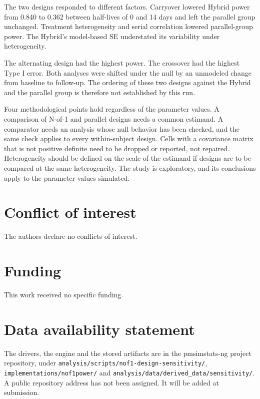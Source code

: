 \documentclass[
  11pt,
]{article}
\begin{document}
The two designs responded to different factors. Carryover lowered Hybrid power from 0.840 to 0.362 between half-lives of 0 and 14 days and left the parallel group unchanged. Treatment heterogeneity and serial correlation lowered parallel-group power. The Hybrid's model-based SE understated its variability under heterogeneity.

The alternating design had the highest power. The crossover had the highest Type I error. Both analyses were shifted under the null by an unmodeled change from baseline to follow-up. The ordering of these two designs against the Hybrid and the parallel group is therefore not established by this run.

Four methodological points hold regardless of the parameter values. A comparison of N-of-1 and parallel designs needs a common estimand. A comparator needs an analysis whose null behavior has been checked, and the same check applies to every within-subject design. Cells with a covariance matrix that is not positive definite need to be dropped or reported, not repaired. Heterogeneity should be defined on the scale of the estimand if designs are to be compared at the same heterogeneity. The study is exploratory, and its conclusions apply to the parameter values simulated.

\section{Conflict of interest}\label{conflict-of-interest}

The authors declare no conflicts of interest.

\section{Funding}\label{funding}

This work received no specific funding.

\section{Data availability statement}\label{data-availability-statement}

The drivers, the engine and the stored artifacts are in the pmsimstats-ng project repository, under \texttt{analysis/scripts/nof1-design-sensitivity/}, \texttt{implementations/nof1power/} and \texttt{analysis/data/derived\_data/sensitivity/}. A public repository address has not been assigned. It will be added at submission.
\end{document}
